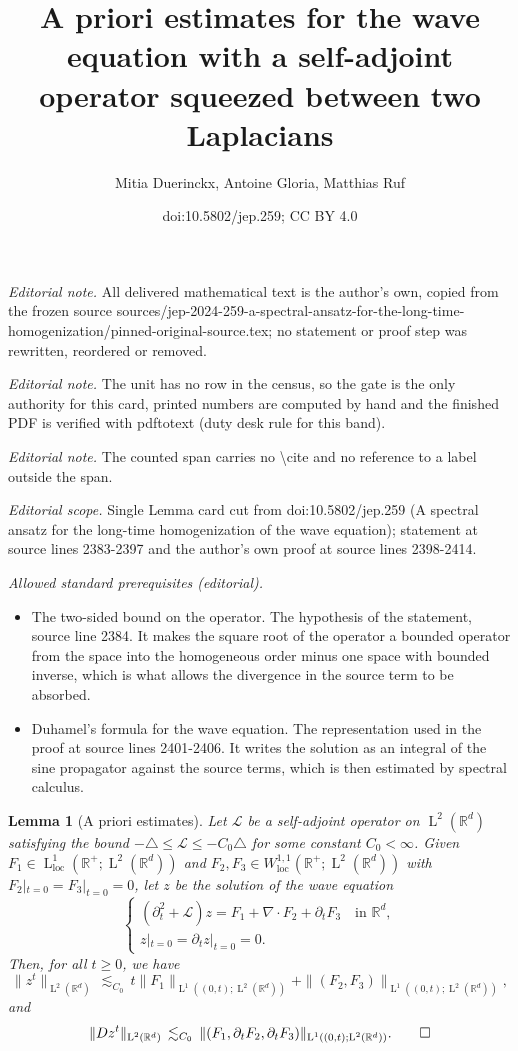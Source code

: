 \documentclass[10pt,a4paper]{article}
\title{A priori estimates for the wave equation with a self-adjoint operator squeezed between two Laplacians}
\author{Mitia Duerinckx, Antoine Gloria, Matthias Ruf}
\date{doi:10.5802/jep.259; CC BY 4.0}
\theoremstyle{plain}
\newtheorem{lem0}[theor0]{Lemma}
\newenvironment{lem}
{\renewcommand{\qedsymbol}{$\lozenge$}\pushQED{\qed}\begin{lem0}}
{\popQED\end{lem0}}
\theoremstyle{definition}
\numberwithin{equation}{section}
\newcommand{\Lc}{\mathcal{L}}
\newcommand{\R}{\mathbb R}
\newcommand{\loc}{{\operatorname{loc}}}
\newcommand{\Ld}{\operatorname{L}}
\begin{document}
\maketitle
\setcounter{section}{1}
\noindent\textit{Editorial note.} All delivered mathematical text is the author's own, copied from the frozen source sources/jep-2024-259-a-spectral-ansatz-for-the-long-time-homogenization/pinned-original-source.tex; no statement or proof step was rewritten, reordered or removed.\par\medskip
\noindent\textit{Editorial note.} The unit has no row in the census, so the gate is the only authority for this card, printed numbers are computed by hand and the finished PDF is verified with pdftotext (duty desk rule for this band).\par\medskip
\noindent\textit{Editorial note.} The counted span carries no \textbackslash{}cite and no reference to a label outside the span.\par\medskip
\noindent\textit{Editorial scope.} Single Lemma card cut from doi:10.5802/jep.259 (A spectral ansatz for the long-time homogenization of the wave equation); statement at source lines 2383-2397 and the author's own proof at source lines 2398-2414.\par\medskip
\noindent\textit{Allowed standard prerequisites (editorial).}\begin{itemize}
\item The two-sided bound on the operator. The hypothesis of the statement, source line 2384. It makes the square root of the operator a bounded operator from the space into the homogeneous order minus one space with bounded inverse, which is what allows the divergence in the source term to be absorbed.
\item Duhamel's formula for the wave equation. The representation used in the proof at source lines 2401-2406. It writes the solution as an integral of the sine propagator against the source terms, which is then estimated by spectral calculus.
\end{itemize}\medskip
\begin{lem}[A priori estimates]\label{lem:apriori}
Let $\Lc$ be a self-adjoint operator on $\Ld^2(\R^d)$ satisfying the bound $-\triangle\le\Lc\le-C_0\triangle$ for some constant $C_0<\infty$. Given
$F_1\in\Ld^1_\loc(\R^+;\Ld^2(\R^d))$ and $F_2,F_3\in W^{1,1}_\loc(\R^+;\Ld^2(\R^d))$ with $F_2|_{t=0}=F_3|_{t=0}=0$, let $z$ be the solution of the wave equation
\begin{equation*}
\begin{cases}
(\partial_t^2+\Lc) z=F_1+\nabla \cdot F_2+\partial_t F_3\quad\text{in $\R^d$},\\
z|_{t=0}=\partial_t z|_{t=0}=0.
\end{cases}
\end{equation*}
Then, for all $t\ge 0$, we have
\[\|z^t\|_{\Ld^2(\R^d)}\,\lesssim_{C_0}\,t\|F_1\|_{\Ld^1((0,t);\Ld^2(\R^d))}+\|(F_2,F_3)\|_{\Ld^1((0,t);\Ld^2(\R^d))},\]
and
\[\|Dz^t\|_{\Ld^2(\R^d)} \,\lesssim_{C_0}\,\|(F_1,\partial_tF_2,\partial_tF_3)\|_{\Ld^1((0,t);\Ld^2(\R^d))}.\qedhere\]
\end{lem}
\end{document}
